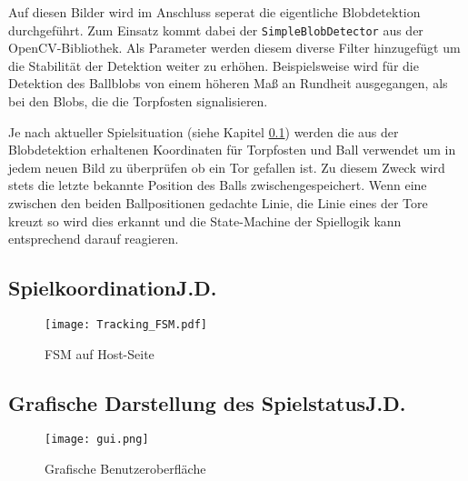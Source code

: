 Auf diesen Bilder wird im Anschluss seperat die eigentliche Blobdetektion durchgeführt. Zum Einsatz kommt dabei der \texttt{SimpleBlobDetector} aus der OpenCV-Bibliothek. Als Parameter werden diesem diverse Filter hinzugefügt um die Stabilität der Detektion weiter zu erhöhen. Beispielsweise wird für die Detektion des Ballblobs von einem höheren Maß an Rundheit ausgegangen, als bei den Blobs, die die Torpfosten signalisieren.

Je nach aktueller Spielsituation (siehe Kapitel \ref{kap:spielkoordination}) werden die aus der Blobdetektion erhaltenen Koordinaten für Torpfosten und Ball verwendet um in jedem neuen Bild zu überprüfen ob ein Tor gefallen ist. Zu diesem Zweck wird stets die letzte bekannte Position des Balls zwischengespeichert. Wenn eine zwischen den beiden Ballpositionen gedachte Linie, die Linie eines der Tore kreuzt so wird dies erkannt und die State-Machine der Spiellogik kann entsprechend darauf reagieren.

\subsection[Spielkoordination]{Spielkoordination\hfill {\normalsize J.D.}} \label{kap:spielkoordination}%
\begin{figure}
	\begin{center}
		\texttt{[image: Tracking\_FSM.pdf]} 	
		\caption{FSM auf Host-Seite}
		\label{fig:fsm-host}
	\end{center}
\end{figure}

\subsection[Grafische Darstellung des Spielstatus]{Grafische Darstellung des Spielstatus\hfill {\normalsize J.D.}} %

\begin{figure}
	\begin{center}
		\texttt{[image: gui.png]} 	
		\caption{Grafische Benutzeroberfläche}
		\label{fig:gui}
	\end{center}
\end{figure}
